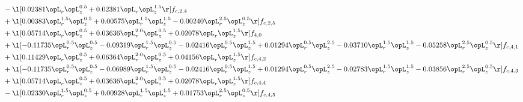 \begin{alignat}{2}
& - \l[  0.02381 \opL_r \opL_z^{0.5} +  0.02381 \opL_r \opL_z^{1.5}  \r] f_{c,2,4} \nonumber \\ 
& + \l[  0.00383 \opL_r^{1.5} \opL_z^{0.5} +  0.00575 \opL_r^{1.5} \opL_z^{1.5}   -0.00240 \opL_r^{2.5} \opL_z^{0.5}  \r] f_{c,2,5} \nonumber \\ 
& + \l[  0.05714 \opL_r \opL_z^{0.5} +  0.03636 \opL_r^{2.0} \opL_z^{0.5} +  0.02078 \opL_r \opL_z^{1.5}  \r] f_{4,0} \nonumber \\ 
& + \l[  -0.11735 \opL_r^{0.5} \opL_z^{0.5}   -0.09319 \opL_r^{1.5} \opL_z^{0.5}   -0.02416 \opL_r^{0.5} \opL_z^{1.5} +  0.01294 \opL_r^{0.5} \opL_z^{2.5}   -0.03710 \opL_r^{1.5} \opL_z^{1.5}   -0.05258 \opL_r^{2.5} \opL_z^{0.5}  \r] f_{c,4,1} \nonumber \\ 
& + \l[  0.11429 \opL_r \opL_z^{0.5} +  0.06364 \opL_r^{2.0} \opL_z^{0.5} +  0.04156 \opL_r \opL_z^{1.5}  \r] f_{c,4,2} \nonumber \\ 
& + \l[  -0.11735 \opL_r^{0.5} \opL_z^{0.5}   -0.06989 \opL_r^{1.5} \opL_z^{0.5}   -0.02416 \opL_r^{0.5} \opL_z^{1.5} +  0.01294 \opL_r^{0.5} \opL_z^{2.5}   -0.02783 \opL_r^{1.5} \opL_z^{1.5}   -0.03856 \opL_r^{2.5} \opL_z^{0.5}  \r] f_{c,4,3} \nonumber \\ 
& + \l[  0.05714 \opL_r \opL_z^{0.5} +  0.03636 \opL_r^{2.0} \opL_z^{0.5} +  0.02078 \opL_r \opL_z^{1.5}  \r] f_{c,4,4} \nonumber \\ 
& - \l[  0.02330 \opL_r^{1.5} \opL_z^{0.5} +  0.00928 \opL_r^{1.5} \opL_z^{1.5} +  0.01753 \opL_r^{2.5} \opL_z^{0.5}  \r] f_{c,4,5} \nonumber \\ 
\end{alignat} 


